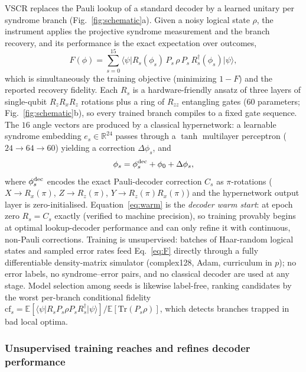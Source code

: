 \documentclass[aps,prxquantum,reprint,superscriptaddress]{revtex4-2}
\newcommand{\ket}[1]{\lvert #1\rangle}
\newcommand{\bra}[1]{\langle #1\rvert}
\newcommand{\tr}{\mathrm{Tr}}
\begin{document}
VSCR replaces the Pauli lookup of a standard decoder by a learned unitary per
syndrome branch (Fig.~\ref{fig:schematic}a). Given a noisy logical state
$\rho$, the instrument applies the projective syndrome measurement and the
branch recovery, and its performance is the exact expectation over outcomes,
\begin{equation}
F(\phi)=\sum_{s=0}^{15}\bra{\psi}R_s(\phi_s)\,P_s\,\rho\,P_s\,
R_s^\dagger(\phi_s)\ket{\psi},
\label{eq:F}
\end{equation}
which is simultaneously the training objective (minimizing $1-F$) and the
reported recovery fidelity. Each $R_s$ is a hardware-friendly ansatz of three
layers of single-qubit $R_zR_xR_z$ rotations plus a ring of $R_{zz}$
entangling gates ($60$ parameters; Fig.~\ref{fig:schematic}b), so every
trained branch compiles to a fixed gate sequence. The $16$ angle vectors are
produced by a classical hypernetwork: a learnable syndrome embedding
$e_s\in\mathbb{R}^{24}$ passes through a $\tanh$ multilayer perceptron
($24\!\to\!64\!\to\!60$) yielding a correction $\Delta\phi_s$, and
\begin{equation}
\phi_s=\phi^{\rm dec}_s+\phi_0+\Delta\phi_s,
\label{eq:warm}
\end{equation}
where $\phi^{\rm dec}_s$ encodes the exact Pauli-decoder correction $C_s$ as
$\pi$-rotations ($X\!\to\!R_x(\pi)$, $Z\!\to\!R_z(\pi)$,
$Y\!\to\!R_z(\pi)R_x(\pi)$) and the hypernetwork output layer is
zero-initialised. Equation~\eqref{eq:warm} is the \emph{decoder warm start}:
at epoch zero $R_s=C_s$ exactly (verified to machine precision), so training
provably begins at optimal lookup-decoder performance and can only refine it
with continuous, non-Pauli corrections. Training is unsupervised: batches of
Haar-random logical states and sampled error rates feed
Eq.~\eqref{eq:F} directly through a fully differentiable density-matrix
simulator (complex128, Adam, curriculum in $p$); no error labels, no
syndrome--error pairs, and no classical decoder are used at any stage.
Model selection among seeds is likewise label-free, ranking candidates by the
worst per-branch conditional fidelity
$\mathrm{cf}_s=\mathbb{E}[\bra{\psi}R_sP_s\rho P_sR_s^\dagger\ket{\psi}]/
\mathbb{E}[\tr(P_s\rho)]$, which detects branches trapped in bad local
optima.

\subsubsection*{Unsupervised training reaches and refines decoder performance}
\end{document}
